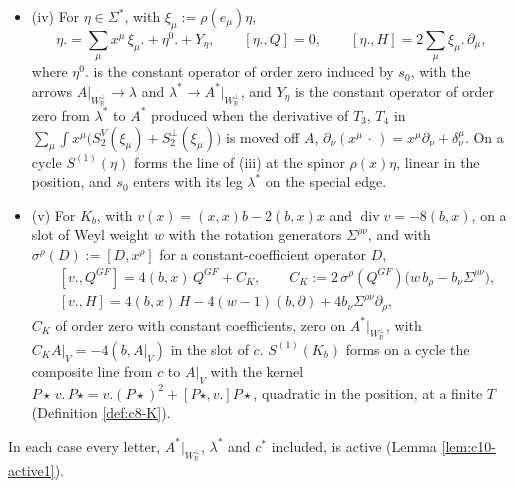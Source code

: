 \begin{lemma}
\begin{itemize}
\[
P\star\,\xi.\,P\star=C_\xi\,Q^{GF}g(H)^2-\xi.\,(Q^{GF})^2g(H)^2,\qquad \big[Q,P\star\,\xi.\,P\star\big]=E(H)\,C_\xi\,g(H)\neq0 .
\]
The terms of $S^{(1)}(\xi)$ with a leg $A^*|_{W_{\mathbb R}^\perp}$ or $\lambda^*$ enter a cycle with that leg on the special edge, and a term $T_5$ also with its leg $\lambda^*$ as an output.
\item (iv) For $\eta\in\Sigma^*$, with $\xi_\mu:=\rho(e_\mu)\eta$,
\[
\eta.=\sum_\mu x^\mu\,\xi_\mu.+\eta^0.+Y_\eta,\qquad [\eta.,Q]=0,\qquad [\eta.,H]=2\sum_\mu\xi_\mu.\,\partial_\mu,
\]
where $\eta^0.$ is the constant operator of order zero induced by $s_0$, with the arrows $A|_{W_{\mathbb R}^\perp}\to\lambda$ and $\lambda^*\to A^*|_{W_{\mathbb R}^\perp}$, and $Y_\eta$ is the constant operator of order zero from $\lambda^*$ to $A^*$ produced when the derivative of $T_3$, $T_4$ in $\sum_\mu\int x^\mu\big(S^V_2(\xi_\mu)+S^\perp_2(\xi_\mu)\big)$ is moved off $A$, $\partial_\nu(x^\mu\,\cdot\,)=x^\mu\partial_\nu+\delta^\mu_\nu$. On a cycle $S^{(1)}(\eta)$ forms the line of (iii) at the spinor $\rho(x)\eta$, linear in the position, and $s_0$ enters with its leg $\lambda^*$ on the special edge.
\item (v) For $K_b$, with $v(x)=(x,x)b-2(b,x)x$ and $\operatorname{div}v=-8(b,x)$, on a slot of Weyl weight $w$ with the rotation generators $\Sigma^{\rho\nu}$, and with $\sigma^\rho(D):=[D,x^\rho]$ for a constant-coefficient operator $D$,
\[
\begin{aligned}
&[v.,Q^{GF}]=4(b,x)\,Q^{GF}+C_K,\qquad C_K:=2\,\sigma^\rho(Q^{GF})\big(w\,b_\rho-b_\nu\Sigma^{\rho\nu}\big),\\
&[v.,H]=4(b,x)\,H-4(w-1)(b,\partial)+4b_\nu\Sigma^{\rho\nu}\partial_\rho,
\end{aligned}
\]
$C_K$ of order zero with constant coefficients, zero on $A^*|_{W_{\mathbb R}^\perp}$, with $C_KA|_V=-4(b,A|_V)$ in the slot of $c$. $S^{(1)}(K_b)$ forms on a cycle the composite line from $c$ to $A|_V$ with the kernel $P\star\,v.\,P\star=v.(P\star)^2+[P\star,v.]P\star$, quadratic in the position, at a finite $T$ (Definition \ref{def:c8-K}).
\end{itemize}
In each case every letter, $A^*|_{W_{\mathbb R}^\perp}$, $\lambda^*$ and $c^*$ included, is active (Lemma \ref{lem:c10-active1}).
\end{lemma}

